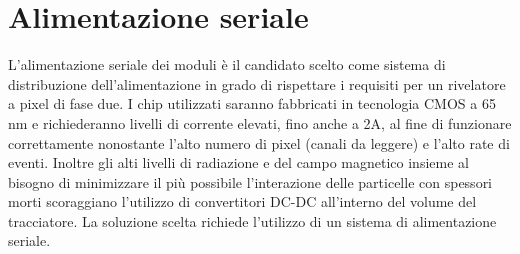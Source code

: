 \chapter{Alimentazione seriale}
L'alimentazione seriale dei moduli è il candidato scelto come sistema di distribuzione dell'alimentazione in grado di rispettare i requisiti per un rivelatore a pixel di fase due. 
I chip utilizzati saranno fabbricati in tecnologia CMOS a 65 nm e richiederanno livelli di corrente elevati, fino anche a 2A, al fine di funzionare correttamente nonostante l'alto numero di pixel (canali da leggere) e l'alto rate di eventi.
Inoltre gli alti livelli di radiazione e del campo magnetico insieme al bisogno di minimizzare il più possibile  l'interazione delle particelle con spessori morti scoraggiano l'utilizzo di convertitori DC-DC all'interno del volume del tracciatore. La soluzione scelta richiede l'utilizzo di un sistema di alimentazione seriale. 


